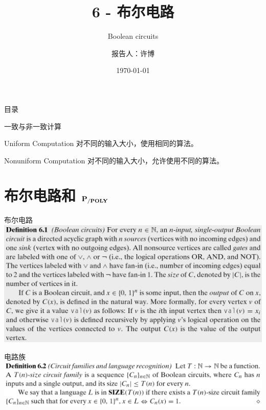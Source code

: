 \documentclass[UTF8,aspectratio=169,mathserif]{beamer}
\title{6 - 布尔电路}
\subtitle{Boolean circuits}
\author{报告人：许博}
\date{\today}
\begin{document}
	
	\begin{frame}
		\titlepage
	\end{frame}
	
	\begin{frame}{目录}
		\tableofcontents
	\end{frame}

	\begin{frame}{一致与非一致计算}
		\begin{block}{Uniform Computation}
			对不同的输入大小，使用相同的算法。
		\end{block}
	
		\begin{block}{Nonuniform Computation}
			对不同的输入大小，允许使用不同的算法。
		\end{block}
	\end{frame}
	
	\section{布尔电路和 $\bf P_{/POLY}$}
	\begin{frame}{布尔电路}
		\includegraphics[width=0.9\linewidth]{../../5 & 6/note.assets/image-20210427143007226.png}
	\end{frame}
	
	\begin{frame}{电路族}
		\includegraphics[width=\linewidth]{../../5 & 6/note.assets/image-20210427143311429.png}
	\end{frame}
\end{document}
